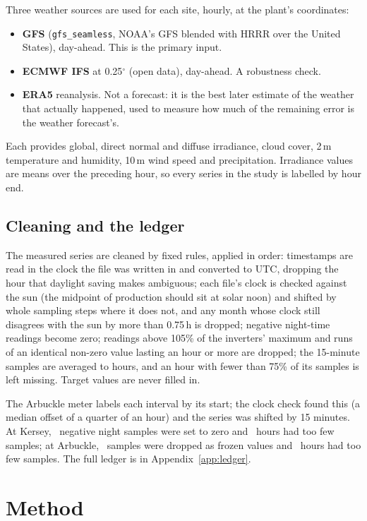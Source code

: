\documentclass[11pt]{article}
\begin{document}
Three weather sources are used for each site, hourly, at the plant's coordinates:
\begin{itemize}
\item \textbf{GFS} (\texttt{gfs\_seamless}, NOAA's GFS blended with HRRR over the United States), day-ahead. This is the primary input.
\item \textbf{ECMWF IFS} at 0.25$^\circ$ (open data), day-ahead. A robustness check.
\item \textbf{ERA5} reanalysis. Not a forecast: it is the best later estimate of the weather that actually happened, used to measure how much of the remaining error is the weather forecast's.
\end{itemize}
Each provides global, direct normal and diffuse irradiance, cloud cover, 2\,m temperature and humidity, 10\,m wind speed and precipitation. Irradiance values are means over the preceding hour, so every series in the study is labelled by hour end.

\subsection{Cleaning and the ledger}

The measured series are cleaned by fixed rules, applied in order: timestamps are read in the clock the file was written in and converted to UTC, dropping the hour that daylight saving makes ambiguous; each file's clock is checked against the sun (the midpoint of production should sit at solar noon) and shifted by whole sampling steps where it does not, and any month whose clock still disagrees with the sun by more than 0.75\,h is dropped; negative night-time readings become zero; readings above 105\% of the inverters' maximum and runs of an identical non-zero value lasting an hour or more are dropped; the 15-minute samples are averaged to hours, and an hour with fewer than 75\% of its samples is left missing. Target values are never filled in.

The Arbuckle meter labels each interval by its start; the clock check found this (a median offset of a quarter of an hour) and the series was shifted by 15 minutes. At Kersey, \KerLedNeg\ negative night samples were set to zero and \KerLedThin\ hours had too few samples; at Arbuckle, \ArbLedStuck\ samples were dropped as frozen values and \ArbLedThin\ hours had too few samples. The full ledger is in Appendix~\ref{app:ledger}.

\section{Method}
\end{document}
